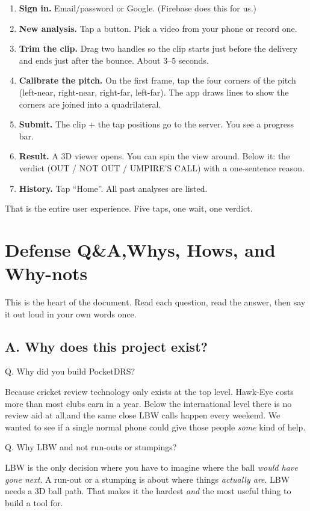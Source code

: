 \documentclass[11pt,a4paper]{article}
\newcommand{\qa}[2]{%
  \par\vspace{8pt}%
  \noindent
  \colorbox{NavyTint}{%
    \begin{minipage}{\dimexpr\textwidth-2\fboxsep\relax}%
      \color{white}\bfseries\strut Q. #1%
    \end{minipage}%
  }\par\nobreak
  \noindent
  \colorbox{MutedBg}{%
    \begin{minipage}{\dimexpr\textwidth-2\fboxsep\relax}%
      \color{black}\setlength{\parskip}{4pt}\strut #2\strut%
    \end{minipage}%
  }%
  \par\vspace{6pt}%
}
\begin{document}
\begin{enumerate}
    \item \textbf{Sign in.} Email/password or Google. (Firebase does this for us.)
    \item \textbf{New analysis.} Tap a button. Pick a video from your phone or record one.
    \item \textbf{Trim the clip.} Drag two handles so the clip starts just before the delivery and ends just after the bounce. About 3--5 seconds.
    \item \textbf{Calibrate the pitch.} On the first frame, tap the four corners of the pitch (left-near, right-near, right-far, left-far). The app draws lines to show the corners are joined into a quadrilateral.
    \item \textbf{Submit.} The clip + the tap positions go to the server. You see a progress bar.
    \item \textbf{Result.} A 3D viewer opens. You can spin the view around. Below it: the verdict (OUT / NOT OUT / UMPIRE'S CALL) with a one-sentence reason.
    \item \textbf{History.} Tap ``Home''. All past analyses are listed.
\end{enumerate}

That is the entire user experience. Five taps, one wait, one verdict.

\section{Defense Q\&A,Whys, Hows, and Why-nots}

This is the heart of the document. Read each question, read the answer, then say it out loud in your own words once.

\subsection{A. Why does this project exist?}

\qa{Why did you build PocketDRS?}{%
Because cricket review technology only exists at the top level. Hawk-Eye costs more than most clubs earn in a year. Below the international level there is no review aid at all,and the same close LBW calls happen every weekend. We wanted to see if a single normal phone could give those people \emph{some} kind of help.}

\qa{Why LBW and not run-outs or stumpings?}{%
LBW is the only decision where you have to imagine where the ball \emph{would have gone next}. A run-out or a stumping is about where things \emph{actually are}. LBW needs a 3D ball path. That makes it the hardest \emph{and} the most useful thing to build a tool for.}
\end{document}
